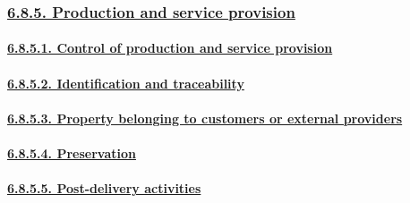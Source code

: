 \documentclass[
]{article}
\begin{document}
\hypertarget{production-and-service-provision}{%
\subsubsection{\texorpdfstring{\protect\hyperlink{production-and-service-provision-1}{6.8.5.
Production and service
provision}}{6.8.5. Production and service provision}}\label{production-and-service-provision}}

\hypertarget{control-of-production-and-service-provision}{%
\paragraph{\texorpdfstring{\protect\hyperlink{control-of-production-and-service-provision-1}{6.8.5.1.
Control of production and service
provision}}{6.8.5.1. Control of production and service provision}}\label{control-of-production-and-service-provision}}

\hypertarget{identification-and-traceability}{%
\paragraph{\texorpdfstring{\protect\hyperlink{identification-and-traceability-1}{6.8.5.2.
Identification and
traceability}}{6.8.5.2. Identification and traceability}}\label{identification-and-traceability}}

\hypertarget{property-belonging-to-customers-or-external-providers}{%
\paragraph{\texorpdfstring{\protect\hyperlink{property-belonging-to-customers-or-external-providers-1}{6.8.5.3.
Property belonging to customers or external
providers}}{6.8.5.3. Property belonging to customers or external providers}}\label{property-belonging-to-customers-or-external-providers}}

\hypertarget{preservation}{%
\paragraph{\texorpdfstring{\protect\hyperlink{preservation-1}{6.8.5.4.
Preservation}}{6.8.5.4. Preservation}}\label{preservation}}

\hypertarget{post-delivery-activities}{%
\paragraph{\texorpdfstring{\protect\hyperlink{post-delivery-activities-1}{6.8.5.5.
Post-delivery
activities}}{6.8.5.5. Post-delivery activities}}\label{post-delivery-activities}}
\end{document}

